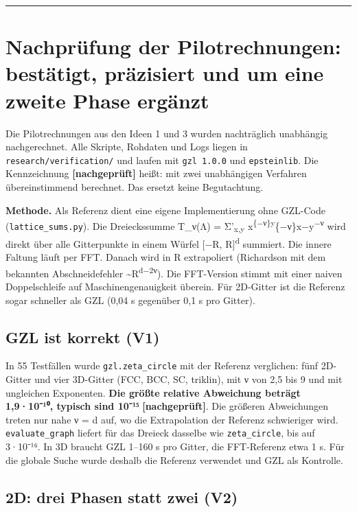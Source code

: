 \begin{center}\rule{0.5\linewidth}{0.5pt}\end{center}

\section{Nachprüfung der Pilotrechnungen: bestätigt, präzisiert und um eine zweite Phase ergänzt}

Die Pilotrechnungen aus den Ideen 1 und 3 wurden nachträglich unabhängig nachgerechnet. Alle Skripte, Rohdaten und Logs liegen in \texttt{research/verification/} und laufen mit \texttt{gzl\ 1.0.0} und \texttt{epsteinlib}. Die Kennzeichnung \textbf{{[}nachgeprüft{]}} heißt: mit zwei unabhängigen Verfahren übereinstimmend berechnet. Das ersetzt keine Begutachtung.

\textbf{Methode.} Als Referenz dient eine eigene Implementierung ohne GZL-Code (\texttt{lattice\_sums.py}). Die Dreieckssumme T\_ν(Λ) = Σ'\textsubscript{x,y} \textbar x\textbar{}\textsuperscript{\{−ν\}\textbar y\textbar{}}\{−ν\}\textbar x−y\textbar{}\textsuperscript{−ν} wird direkt über alle Gitterpunkte in einem Würfel {[}−R, R{]}\textsuperscript{d} summiert. Die innere Faltung läuft per FFT. Danach wird in R extrapoliert (Richardson mit dem bekannten Abschneidefehler \textasciitilde R\textsuperscript{d−2ν}). Die FFT-Version stimmt mit einer naiven Doppelschleife auf Maschinengenauigkeit überein. Für 2D-Gitter ist die Referenz sogar schneller als GZL (0,04 s gegenüber 0,1 s pro Gitter).

\subsection{GZL ist korrekt (V1)}

In 55 Testfällen wurde \texttt{gzl.zeta\_circle} mit der Referenz verglichen: fünf 2D-Gitter und vier 3D-Gitter (FCC, BCC, SC, triklin), mit ν von 2,5 bis 9 und mit ungleichen Exponenten. \textbf{Die größte relative Abweichung beträgt 1,9·10⁻¹⁰, typisch sind 10⁻¹⁵} \textbf{{[}nachgeprüft{]}}. Die größeren Abweichungen treten nur nahe ν = d auf, wo die Extrapolation der Referenz schwieriger wird. \texttt{evaluate\_graph} liefert für das Dreieck dasselbe wie \texttt{zeta\_circle}, bis auf 3·10⁻¹⁶. In 3D braucht GZL 1--160 s pro Gitter, die FFT-Referenz etwa 1 s. Für die globale Suche wurde deshalb die Referenz verwendet und GZL als Kontrolle.

\subsection{2D: drei Phasen statt zwei (V2)}


